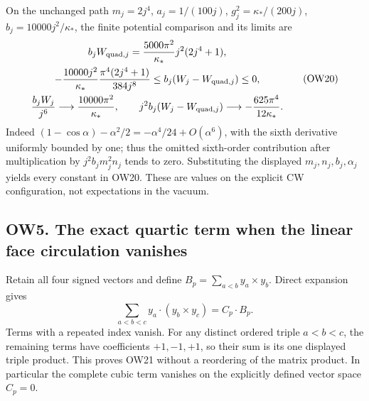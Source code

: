 \documentclass[11pt]{article}
\begin{document}
On the unchanged path \(m_j=2j^4\), \(a_j=1/(100j)\), \(g_j^2=\kappa_*/(200j)\), \(b_j=10000j^2/\kappa_*\), the finite potential comparison and its limits are
\[
 \begin{gathered}
 b_jW_{{\rm quad},j}=\frac{5000\pi^2}{\kappa_*}j^2(2j^4+1),\\
 -\frac{10000j^2}{\kappa_*}\frac{\pi^4(2j^4+1)}{384j^8}
 \le b_j(W_j-W_{{\rm quad},j})\le0,\\
 \frac{b_jW_j}{j^6}\longrightarrow\frac{10000\pi^2}{\kappa_*},\qquad
 j^2b_j(W_j-W_{{\rm quad},j})\longrightarrow-\frac{625\pi^4}{12\kappa_*}.
 \end{gathered}                                             \tag{OW20}
\]
Indeed \((1-\cos\alpha)-\alpha^2/2=-\alpha^4/24+O(\alpha^6)\), with the sixth derivative uniformly bounded by one; thus the omitted sixth-order contribution after multiplication by \(j^2b_jm_j^2n_j\) tends to zero. Substituting the displayed \(m_j,n_j,b_j,\alpha_j\) yields every constant in OW20. These are values on the explicit CW configuration, not expectations in the vacuum.

\subsection*{OW5. The exact quartic term when the linear face circulation vanishes}

Retain all four signed vectors and define \(B_p=\sum_{a<b}y_a\times y_b\). Direct expansion gives
\[
 \sum_{a<b<c}y_a\cdot(y_b\times y_c)=C_p\cdot B_p.       \tag{OW21}
\]
Terms with a repeated index vanish. For any distinct ordered triple \(a<b<c\), the remaining terms have coefficients \(+1,-1,+1\), so their sum is its one displayed triple product. This proves OW21 without a reordering of the matrix product. In particular the complete cubic term vanishes on the explicitly defined vector space \(C_p=0\).
\end{document}
